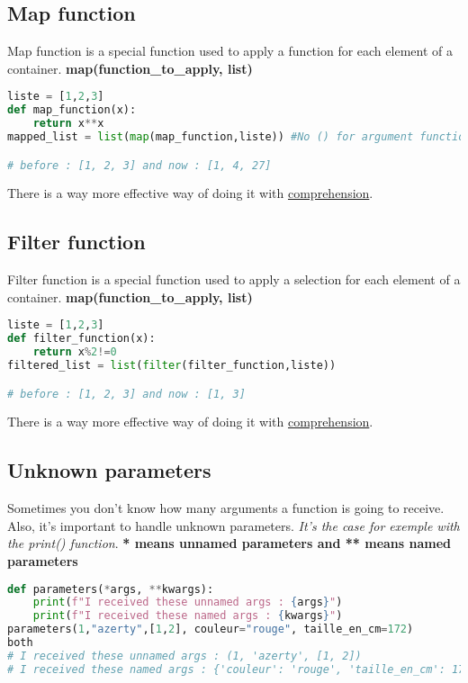 \documentclass[a4paper, 12pt, titlepage]{scrartcl} %
\begin{document}
\subsection{Map function}
Map function is a special function used to apply a function for each element of a container. \textbf{map(function\_to\_apply, list)}
\begin{lstlisting}[language=Python]
liste = [1,2,3]
def map_function(x):
	return x**x
mapped_list = list(map(map_function,liste)) #No () for argument function

# before : [1, 2, 3] and now : [1, 4, 27]
\end{lstlisting} \vspace{5mm}

There is a way more effective way of doing it with \hyperref[Comprehension]{comprehension}.

\subsection{Filter function}
Filter function is a special function used to apply a selection for each element of a container. \textbf{map(function\_to\_apply, list)}
\begin{lstlisting}[language=Python]
liste = [1,2,3]
def filter_function(x):
	return x%2!=0
filtered_list = list(filter(filter_function,liste))

# before : [1, 2, 3] and now : [1, 3]
\end{lstlisting} \vspace{5mm}

There is a way more effective way of doing it with \hyperref[Comprehension]{comprehension}.

\subsection{Unknown parameters}
Sometimes you don't know how many arguments a function is going to receive. Also, it's important to handle unknown parameters. \textit{It's the case for exemple with the print() function}. \textbf{* means unnamed parameters and ** means named parameters}
\begin{lstlisting}[language=Python]
def parameters(*args, **kwargs):
	print(f"I received these unnamed args : {args}")
	print(f"I received these named args : {kwargs}")
parameters(1,"azerty",[1,2], couleur="rouge", taille_en_cm=172)
both
# I received these unnamed args : (1, 'azerty', [1, 2])
# I received these named args : {'couleur': 'rouge', 'taille_en_cm': 172}
\end{lstlisting} \vspace{5mm}
\end{document}
